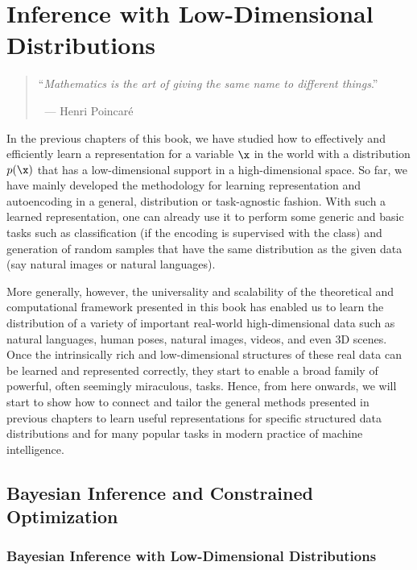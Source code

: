 \documentclass[../../book-main.tex]{subfiles}
\begin{document}
\chapter{Inference with Low-Dimensional Distributions}
\label{ch:conditional-inference}

\begin{quote}

\hfill    ``{\em Mathematics is the art of giving the same name to different things}.''

$~$ \hfill --- Henri Poincar\'e 
\end{quote}
\vspace{5mm}


In the previous chapters of this book, we have studied how to effectively and efficiently learn a representation for a variable $\x$ in the world with a distribution $p(\x)$ that has a low-dimensional support in a high-dimensional space.  So far, we have mainly developed the methodology for learning representation and autoencoding in a general, distribution or task-agnostic fashion. With such a learned representation, one can already use it to perform some generic and basic tasks such as classification (if the encoding is supervised with the class) and generation of random samples that have the same distribution as the given data (say natural images or natural languages). 

More generally, however, the universality and scalability of the theoretical and computational framework presented in this book has enabled us to learn the distribution of a variety of important real-world high-dimensional data such as natural languages, human poses, natural images, videos, and even 3D scenes. Once the intrinsically rich and low-dimensional structures of these real data can be learned and represented correctly, they start to enable a broad family of powerful, often seemingly miraculous, tasks. Hence, from here onwards, we will start to show how to connect and tailor the general methods presented in previous chapters to learn useful representations for specific structured data distributions and for many popular tasks in modern practice of machine intelligence. 

\section{Bayesian Inference and Constrained Optimization}

\subsection{Bayesian Inference with Low-Dimensional Distributions}
\end{document}
